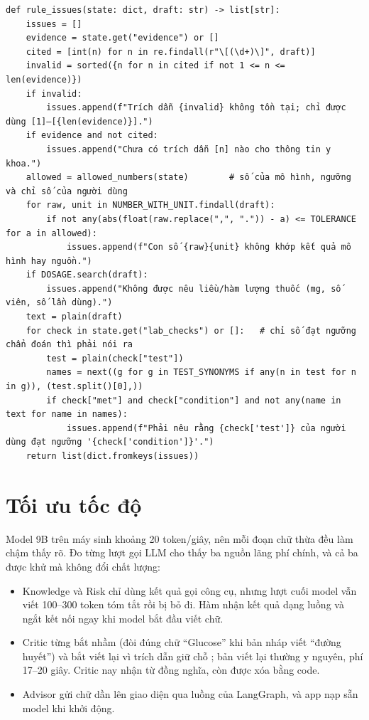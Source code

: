 \documentclass[12pt,a4paper]{report}
\newcommand{\codeinline}[1]{\texttt{\detokenize{#1}}}
\begin{document}
\begin{listing}[H]
\begin{verbatim}
def rule_issues(state: dict, draft: str) -> list[str]:
    issues = []
    evidence = state.get("evidence") or []
    cited = [int(n) for n in re.findall(r"\[(\d+)\]", draft)]
    invalid = sorted({n for n in cited if not 1 <= n <= len(evidence)})
    if invalid:
        issues.append(f"Trích dẫn {invalid} không tồn tại; chỉ được dùng [1]–[{len(evidence)}].")
    if evidence and not cited:
        issues.append("Chưa có trích dẫn [n] nào cho thông tin y khoa.")
    allowed = allowed_numbers(state)        # số của mô hình, ngưỡng và chỉ số của người dùng
    for raw, unit in NUMBER_WITH_UNIT.findall(draft):
        if not any(abs(float(raw.replace(",", ".")) - a) <= TOLERANCE for a in allowed):
            issues.append(f"Con số {raw}{unit} không khớp kết quả mô hình hay nguồn.")
    if DOSAGE.search(draft):
        issues.append("Không được nêu liều/hàm lượng thuốc (mg, số viên, số lần dùng).")
    text = plain(draft)
    for check in state.get("lab_checks") or []:   # chỉ số đạt ngưỡng chẩn đoán thì phải nói ra
        test = plain(check["test"])
        names = next((g for g in TEST_SYNONYMS if any(n in test for n in g)), (test.split()[0],))
        if check["met"] and check["condition"] and not any(name in text for name in names):
            issues.append(f"Phải nêu rằng {check['test']} của người dùng đạt ngưỡng '{check['condition']}'.")
    return list(dict.fromkeys(issues))
\end{verbatim}
\caption{Các luật kiểm duyệt của Critic (\texttt{agents/critic.py}, rút gọn)}
\label{lst:critic}
\end{listing}

\section{Tối ưu tốc độ}
Model 9B trên máy sinh khoảng 20 token/giây, nên mỗi đoạn chữ thừa đều làm chậm thấy rõ. Đo
từng lượt gọi LLM cho thấy ba nguồn lãng phí chính, và cả ba được khử mà không đổi chất lượng:
\begin{itemize}[leftmargin=*]
    \item Knowledge và Risk chỉ dùng kết quả gọi công cụ, nhưng lượt cuối model vẫn viết 100--300
          token tóm tắt rồi bị bỏ đi. Hàm \codeinline{run_tools(need_text=False)} nhận kết quả dạng
          luồng và ngắt kết nối ngay khi model bắt đầu viết chữ.
    \item Critic từng bắt nhầm (đòi đúng chữ ``Glucose'' khi bản nháp viết ``đường huyết'') và bắt
          viết lại vì trích dẫn giữ chỗ \codeinline{[n]}; bản viết lại thường y nguyên, phí 17--20 giây.
          Critic nay nhận từ đồng nghĩa, còn \codeinline{[n]} được xóa bằng code.
    \item Advisor gửi chữ dần lên giao diện qua luồng \codeinline{custom} của LangGraph, và app nạp
          sẵn model khi khởi động.
\end{itemize}
\end{document}
